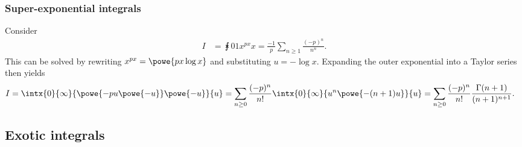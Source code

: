 \documentclass[english, parskip=full]{scrartcl}
\begin{document}
\subsubsection{Super-exponential integrals}
Consider
\begin{align}
I &= \intx{0}{1}{x^{px}}{x} = \frac{-1}{p}\sum_{n\ge 1} \frac{(-p)^n}{n^n}. \label{eqn:x to the p x}
\end{align}
This can be solved by rewriting $x^{px} = \powe{px\log x}$ and substituting $u = -\log x$.
Expanding the outer exponential into a Taylor series then yields
\begin{align}
I &= \intx{0}{\infty}{\powe{-pu \powe{-u}} \powe{-u} }{u} = \sum_{n\ge 0} \frac{(-p)^n}{n!} \intx{0}{\infty}{u^{n} \powe{-(n+1)u}}{u} = \sum_{n\ge 0} \frac{(-p)^n}{n!} \frac{\Gamma (n+1)}{(n+1)^{n+1}}.
\end{align}
\subsection{Exotic integrals}
\end{document}
